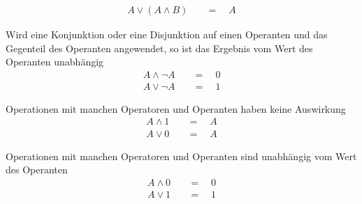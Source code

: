 \documentclass{article}
\newcommand{\feq}{\quad &= \quad}
\begin{document}
\begin{description}
\begin{align*}
 A \lor (A \land B) \feq A
\end{align*}
 \item[Komplemente] Wird eine Konjunktion oder eine Disjunktion auf einen Operanten und das Gegenteil des Operanten angewendet, so ist das Ergebnis vom Wert des Operanten unabhängig
\begin{align*}
 A \land \neg A \feq 0 \\
 A \lor \neg A \feq 1
\end{align*}
 \item[Neutralität] Operationen mit manchen Operatoren und Operanten haben keine Auswirkung
\begin{align*}
 A \land 1 \feq A \\
 A \lor 0 \feq A
\end{align*}
 \item[Elimination] Operationen mit manchen Operatoren und Operanten sind unabhängig vom Wert des Operanten
\begin{align*}
 A \land 0 \feq 0 \\
 A \lor 1 \feq 1
\end{align*}
\end{description}
\end{document}
